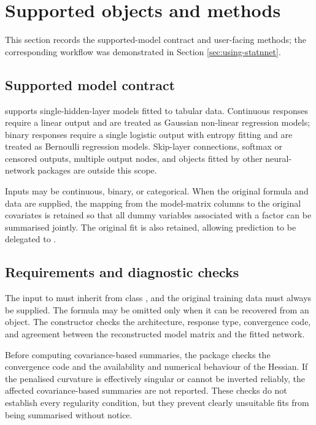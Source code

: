 \section{Supported objects and methods}\label{sec:methods}

This section records the supported-model contract and user-facing methods; the corresponding workflow was demonstrated in Section \ref{sec:using-statnnet}.

\subsection{Supported model contract}\label{supported-model-contract}

 supports single-hidden-layer  models fitted to tabular data.
Continuous responses require a linear output and are treated as Gaussian non-linear regression models; binary responses require a single logistic output with entropy fitting and are treated as Bernoulli regression models.
Skip-layer connections, softmax or censored outputs, multiple output nodes, and objects fitted by other neural-network packages are outside this scope.

Inputs may be continuous, binary, or categorical.
When the original formula and data are supplied, the mapping from the model-matrix columns to the original covariates is retained so that all dummy variables associated with a factor can be summarised jointly.
The original  fit is also retained, allowing prediction to be delegated to .

\subsection{Requirements and diagnostic checks}\label{requirements-and-diagnostic-checks}

The input to  must inherit from class , and the original training data must always be supplied.
The formula may be omitted only when it can be recovered from an  object.
The constructor checks the architecture, response type, convergence code, and agreement between the reconstructed model matrix and the fitted network.

Before computing covariance-based summaries, the package checks the  convergence code and the availability and numerical behaviour of the Hessian.
If the penalised curvature is effectively singular or cannot be inverted reliably, the affected covariance-based summaries are not reported.
These checks do not establish every regularity condition, but they prevent clearly unsuitable fits from being summarised without notice.

